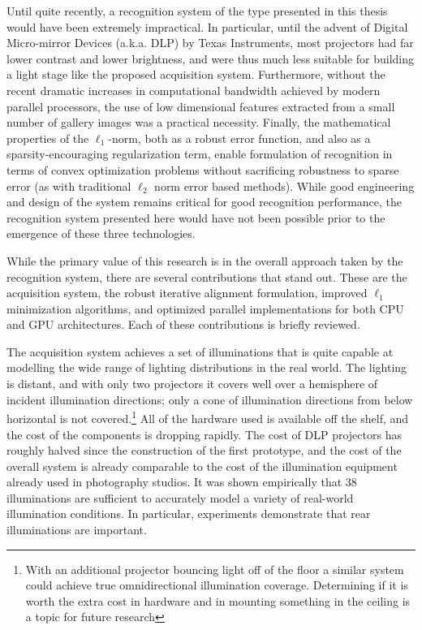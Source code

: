 Until quite recently, a recognition system of the type presented in this thesis
would have been extremely impractical.  In particular, until the advent of
Digital Micro-mirror Devices (a.k.a. DLP) by Texas Instruments, most projectors
had far lower contrast and lower brightness, and were thus much less suitable
for building a light stage like the proposed acquisition system.  Furthermore,
without the recent dramatic increases in computational bandwidth achieved by
modern parallel processors, the use of low dimensional features extracted from
a small number of gallery images was a practical necessity.  Finally, the
mathematical properties of the $\ell_1$-norm, both as a robust error function,
and also as a sparsity-encouraging regularization term, enable formulation of
recognition in terms of convex optimization problems without sacrificing
robustness to sparse error (as with traditional $\ell_2$ norm error based
methods).  While good engineering and design of the system remains critical for
good recognition performance, the recognition system presented here would have
not been possible prior to the emergence of these three technologies.

While the primary value of this research is in the overall approach taken by
the recognition system, there are several contributions that stand out.  These
are the acquisition system, the robust iterative alignment formulation,
improved $\ell_1$ minimization algorithms, and optimized parallel
implementations for both CPU and GPU architectures.  Each of these
contributions is briefly reviewed.

The acquisition system achieves a set of illuminations that is quite capable at
modelling the wide range of lighting distributions in the real world.  The
lighting is distant, and with only two projectors it covers well over a
hemisphere of incident illumination directions; only a cone of illumination
directions from below horizontal is not covered.\footnote{With an additional
projector bouncing light off of the floor a similar system could achieve true
omnidirectional illumination coverage.  Determining if it is worth the extra
cost in hardware and in mounting something in the ceiling is a topic for future
research}  All of the hardware used is available off the shelf, and the cost of
the components is dropping rapidly.  The cost of DLP projectors has roughly
halved since the construction of the first prototype, and the cost of the
overall system is already comparable to the cost of the illumination equipment
already used in photography studios.  It was shown empirically that 38
illuminations are sufficient to accurately model a variety of real-world
illumination conditions.  In particular, experiments demonstrate that rear
illuminations are important.

